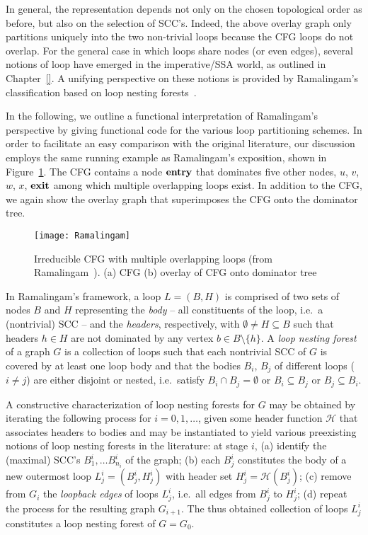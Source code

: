 In general, the representation depends not only on the chosen
topological order as before, but also on the selection of SCC's.
Indeed, the above overlay graph only partitions uniquely into the two
non-trivial loops because the CFG loops do not overlap. For the
general case in which loops share nodes (or even edges), several
notions of loop have emerged in the imperative/SSA world, as outlined
in Chapter~\ref{}. A unifying perspective on these notions is provided
by Ramalingam's classification based on loop nesting
forests~\cite{DBLP:journals/toplas/Ramalingam02}.

In the following, we outline a functional interpretation of
Ramalingam's perspective by giving functional code for the various
loop partitioning schemes. In order to facilitate an easy comparison
with the original literature, our discussion employs the same running
example as Ramalingam's exposition, shown in
Figure~\ref{FigLoopAnalysisRamalingamCFG}. The CFG contains a node
$\mathbf{entry}$ that dominates five other nodes, $u$, $v$, $w$, $x$,
$\mathbf{exit}$ among which multiple overlapping loops exist. In addition
to the CFG, we again show the overlay graph that superimposes the CFG
onto the dominator tree.

\begin{figure}
  \begin{center}
    \texttt{[image: Ramalingam]}
  \end{center}
  \caption{\label{FigLoopAnalysisRamalingamCFG} Irreducible CFG with
    multiple overlapping loops (from
    Ramalingam~\cite{DBLP:journals/toplas/Ramalingam02}). 
    (a) CFG (b) overlay of CFG onto dominator tree}
\end{figure}

In Ramalingam's framework, a loop $L = (B,H)$ is comprised of two sets
of nodes $B$ and $H$ representing the \emph{body} -- all constituents
of the loop, i.e.~a (nontrivial) SCC -- and the \emph{headers},
respectively, with $\emptyset \neq H \subseteq B$ such that headers $h
\in H$ are not dominated by any vertex $b \in B \setminus \{h\}$. A
\emph{loop nesting forest} of a graph $G$ is a collection of loops
such that each nontrivial SCC of $G$ is covered by at least one loop
body and that the bodies $B_i$, $B_j$ of different loops ($i \neq j$)
are either disjoint or nested, i.e.~satisfy $B_i \cap B_j = \emptyset$
or $B_i \subseteq B_j$ or $B_j \subseteq B_i$.

A constructive characterization of loop nesting forests for $G$ may be
obtained by iterating the following process for $i=0,1,\ldots$, given
some header function $\mathcal{H}$ that associates headers to bodies
and may be instantiated to yield various preexisting notions of loop
nesting forests in the literature: at stage $i$, (a) identify the
(maximal) SCC's $B^i_1, \ldots B^i_{n_i}$ of the graph; (b) each
$B^i_j$ constitutes the body of a new outermost loop $L^i_j = (B^i_j,
H^i_j)$ with header set $H^i_j = \mathcal{H}(B^i_j)$; (c) remove from
$G_i$ the \emph{loopback edges} of loops $L^i_j$, i.e.~all edges from
$B^i_j$ to $H^i_j$; (d) repeat the process for the resulting graph
$G_{i+1}$. The thus obtained collection of loops $L^i_j$ constitutes a
loop nesting forest of $G = G_0$.

